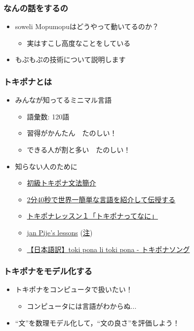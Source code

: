 \documentclass[14pt]{beamer}
\begin{document}
\begin{frame}
	\frametitle{なんの話をするの}

	\begin{itemize}
		\item soweli Mopumopuはどうやって動いてるのか？
			\begin{itemize}
				\item 実はすこし高度なことをしている
			\end{itemize}
		\item もぷもぷの技術について説明します
	\end{itemize}
\end{frame}

\begin{frame}
	\frametitle{トキポナとは}

	\begin{itemize}
		\item みんなが知ってるミニマル言語
			\begin{itemize}
				\item 語彙数: 120語
				\item 習得がかんたん　たのしい！
				\item できる人が割と多い　たのしい！
			\end{itemize}
		\item 知らない人のために
			\begin{itemize}
				\item \href{https://twitter.com/notolytos/status/1409484535151042568}{\small 初級トキポナ文法簡介}
				\item \href{https://www.youtube.com/watch?v=9C0YqTs4vB8}{\small 2分40秒で世界一簡単な言語を紹介して伝授する}
				\item \href{https://www.youtube.com/watch?v=wIFJfAhiPlE}{\small トキポナレッスン１「トキポナってなに」}
				\item \href{https://en.wikibooks.org/wiki/Updated\_jan\_Pije\%27s\_lessons}{\small jan Pije's lessons} 
					{\scriptsize (\href{https://github.com/stefichjo/toki-pona/blob/master/pije.md}{注})}
				\item \href{https://www.youtube.com/watch?v=2jRtYBaZGgQ}{\small 【日本語訳】toki pona li toki pona - トキポナソング}
			\end{itemize}
	\end{itemize}
\end{frame}

\begin{frame}
	\frametitle{トキポナをモデル化する}

	\begin{itemize}
		\item トキポナをコンピュータで扱いたい！
			\begin{itemize}
				\item コンピュータには言語がわからぬ...
			\end{itemize}
		\item ``文''を数理モデル化して，``文の良さ''を評価しよう！
	\end{itemize}
\end{frame}
\end{document}
